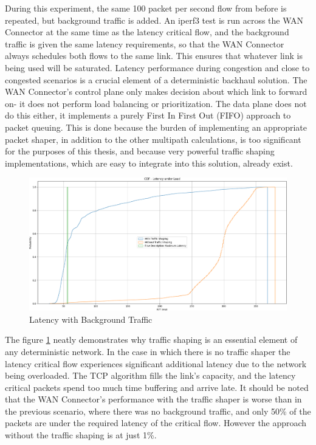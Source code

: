 During this experiment, the same 100 packet per second flow from before is repeated, but background traffic is added. An iperf3 test is run across the WAN Connector at the same time as the latency critical flow, and the background traffic is given the same latency requirements, so that the WAN Connector always schedules both flows to the same link. This ensures that whatever link is being used will be saturated. Latency performance during congestion and close to congested scenarios is a crucial element of a deterministic backhaul solution. The WAN Connector's control plane only makes decision about which link to forward on- it does not perform load balancing or prioritization. The data plane does not do this either, it implements a purely First In First Out (FIFO) approach to packet queuing. This is done because the burden of implementing an appropriate packet shaper, in addition to the other multipath calculations, is too significant for the purposes of this thesis, and because very powerful traffic shaping implementations, which are easy to integrate into this solution, already exist.

\begin{figure}[h]
    \centering
        \includegraphics[height=0.66\textwidth,width=\textwidth]{fig/rrul_cdf.png}
        \caption{Latency with Background Traffic}
        \label{fig:rrul_cdf}
\end{figure}

The figure \ref{fig:rrul_cdf} neatly demonstrates why traffic shaping is an essential element of any deterministic network. In the case in which there is no traffic shaper the latency critical flow experiences significant additional latency due to the network being overloaded. The TCP algorithm fills the link's capacity, and the latency critical packets spend too much time buffering and arrive late. It should be noted that the WAN Connector's performance with the traffic shaper is worse than in the previous scenario, where there was no background traffic, and only 50\% of the packets are under the required latency of the critical flow. However the approach without the traffic shaping is at just 1\%.

